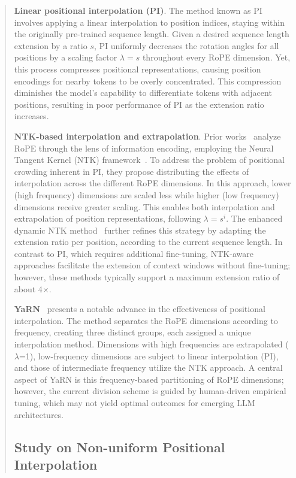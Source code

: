 \begin{abstract}
\textbf{Linear positional interpolation (PI)}. The method known as PI~\cite{pi} involves applying a linear interpolation to position indices, staying within the originally pre-trained sequence length. Given a desired sequence length extension by a ratio $s$, PI uniformly decreases the rotation angles for all positions by a scaling factor $\lambda=s$ throughout every RoPE dimension. Yet, this process compresses positional representations, causing position encodings for nearby tokens to be overly concentrated. This compression diminishes the model’s capability to differentiate tokens with adjacent positions, resulting in poor performance of PI as the extension ratio increases.

\textbf{NTK-based interpolation and extrapolation}. Prior works~\cite{ntk,dynamicntk} analyze RoPE through the lens of information encoding, employing the Neural Tangent Kernel (NTK) framework~\cite{jacot2018neural,tancik2020fourier}. To address the problem of positional crowding inherent in PI, they propose distributing the effects of interpolation across the different RoPE dimensions. In this approach, lower (high frequency) dimensions are scaled less while higher (low frequency) dimensions receive greater scaling. This enables both interpolation and extrapolation of position representations, following $\lambda=s^{i}$. The enhanced dynamic NTK method~\cite{dynamicntk} further refines this strategy by adapting the extension ratio per position, according to the current sequence length. In contrast to PI, which requires additional fine-tuning, NTK-aware approaches facilitate the extension of context windows without fine-tuning; however, these methods typically support a maximum extension ratio of about 4$\times$.

\textbf{YaRN}~\cite{yarn} presents a notable advance in the effectiveness of positional interpolation. The method separates the RoPE dimensions according to frequency, creating three distinct groups, each assigned a unique interpolation method. Dimensions with high frequencies are extrapolated ($\lambda$=1), low-frequency dimensions are subject to linear interpolation (PI), and those of intermediate frequency utilize the NTK approach. A central aspect of YaRN is this frequency-based partitioning of RoPE dimensions; however, the current division scheme is guided by human-driven empirical tuning, which may not yield optimal outcomes for emerging LLM architectures.

\subsection{Study on Non-uniform Positional Interpolation}


\end{abstract}
